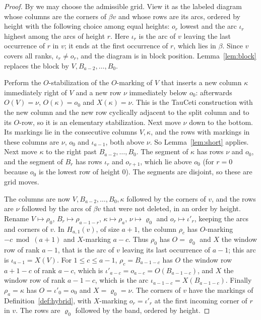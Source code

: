 \documentclass[11pt]{amsart}
\theoremstyle{definition}
\theoremstyle{remark}
\newcommand{\lean}[1]{\texttt{\seqsplit{#1}}}
\begin{document}
\begin{proof}
By \lean{IsAdmissibleWordGrid.movesTo} we may choose the admissible grid. View it as the labeled
diagram whose columns are the corners of $\beta v$ and whose rows are its arcs, ordered by height with
the following choice among equal heights: $o_r$ lowest and the arc $\iota_r$ highest among the arcs
of height $r$. Here $\iota_r$ is the arc of $v$ leaving the last occurrence of $r$ in $v$; it ends at
the first occurrence of $r$, which lies in $\beta$. Since $v$ covers all ranks, $\iota_r\ne o_r$, and
the diagram is in block position. Lemma~\ref{lem:block} replaces the block by $V,B_{a-2},\dots,B_0$.

Perform the $O$-stabilization of the $O$-marking of $V$ that inserts a new column $\kappa$
immediately right of $V$ and a new row $\nu$ immediately below $o_0$: afterwards $O(V)=\nu$,
$O(\kappa)=o_0$ and $X(\kappa)=\nu$. This is the TauCeti construction \lean{stabilizeO} with the new
column and the new row cyclically adjacent to the split column and to its $O$-row, so it is an
elementary stabilization. Next move $\nu$ down to the bottom. Its markings lie in the consecutive
columns $V,\kappa$, and the rows with markings in these columns are $\nu$, $o_0$ and $\iota_{a-1}$,
both above $\nu$. So Lemma~\ref{lem:short} applies. Next move $\kappa$ to the right past
$B_{a-2},\dots,B_0$. The segment of $\kappa$ has rows $\nu$ and $o_0$, and the segment of $B_r$ has
rows $\iota_r$ and $o_{r+1}$, which lie above $o_0$ (for $r=0$ because $o_0$ is the lowest row of
height $0$). The segments are disjoint, so these are grid moves.

The columns are now $V,B_{a-2},\dots,B_0,\kappa$ followed by the corners of $v$, and the rows are
$\nu$ followed by the arcs of $\beta v$ that were not deleted, in an order by height. Rename
$V\mapsto\rho_0$, $B_r\mapsto\rho_{a-1-r}$, $\kappa\mapsto\rho_a$, $\nu\mapsto\varrho_0$ and
$o_r\mapsto\iota'_r$, keeping the arcs and corners of $v$. In $H_{a,1}(v)$, of size $a+1$, the column
$\rho_c$ has $O$-marking $-c\bmod(a+1)$ and $X$-marking $a-c$. Thus $\rho_0$ has $O=\varrho_0$ and $X$
the window row of rank $a-1$, that is the arc of $v$ leaving its last occurrence of $a-1$; this arc is
$\iota_{a-1}=X(V)$. For $1\le c\le a-1$, $\rho_c=B_{a-1-c}$ has $O$ the window row $a+1-c$ of rank
$a-c$, which is $\iota'_{a-c}=o_{a-c}=O(B_{a-1-c})$, and $X$ the window row of rank $a-1-c$, which is the
arc $\iota_{a-1-c}=X(B_{a-1-c})$. Finally $\rho_a=\kappa$ has $O=\iota'_0=o_0$ and $X=\varrho_0=\nu$.
The corners of $v$ have the markings of Definition~\ref{def:hybrid}, with $X$-marking $o_r=\iota'_r$ at
the first incoming corner of $r$ in $v$. The rows are $\varrho_0$ followed by the band, ordered by height.
\end{proof}
\end{document}
